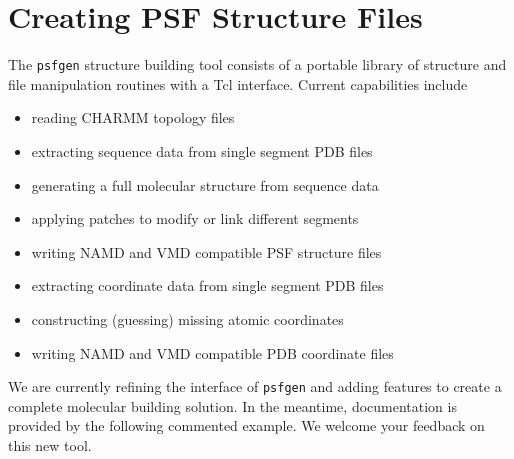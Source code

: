 
%
%
%

\section{Creating PSF Structure Files}
\label{section:psfgen}

The \verb#psfgen# structure building tool consists of a portable library
of structure and file manipulation routines with a Tcl interface.
Current capabilities include
\begin{itemize}
\item reading CHARMM topology files
\item extracting sequence data from single segment PDB files
\item generating a full molecular structure from sequence data
\item applying patches to modify or link different segments
\item writing NAMD and VMD compatible PSF structure files
\item extracting coordinate data from single segment PDB files
\item constructing (guessing) missing atomic coordinates
\item writing NAMD and VMD compatible PDB coordinate files
\end{itemize}

We are currently refining the interface of \verb#psfgen# and adding
features to create a complete molecular building solution.  In the
meantime, documentation is provided by the following commented example.
We welcome your feedback on this new tool.

